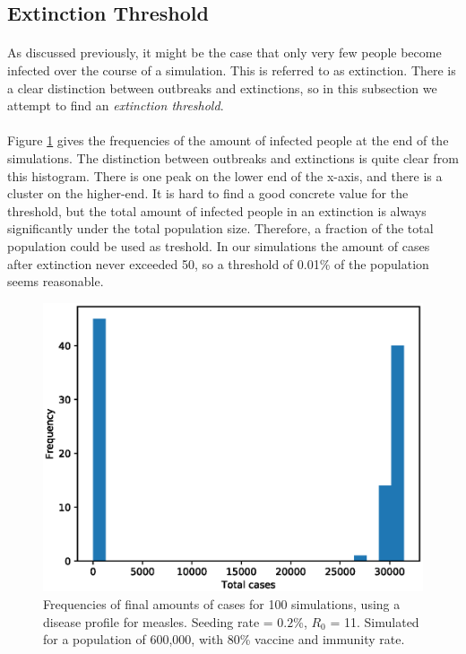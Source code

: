 \documentclass[runningheads]{llncs}
\begin{document}
\subsection{Extinction Threshold}

\paragraph{} As discussed previously, it might be the case that only very few people become infected over the course of a simulation. This is referred to as extinction. There is a clear distinction between outbreaks and extinctions, so in this subsection we attempt to find an \emph{extinction threshold}.

\paragraph{} Figure \ref{ETHist} gives the frequencies of the amount of infected people at the end of the simulations. The distinction between outbreaks and extinctions is quite clear from this histogram. There is one peak on the lower end of the x-axis, and there is a cluster on the higher-end. It is hard to find a good concrete value for the threshold, but the total amount of infected people in an extinction is always significantly under the total population size. Therefore, a fraction of the total population could be used as treshold. In our simulations the amount of cases after extinction never exceeded 50, so a threshold of 0.01\% of the population seems reasonable.

\begin{figure}[!h]
	\includegraphics[width=\textwidth]{Hist.eps}
	\caption{Frequencies of final amounts of cases for 100 simulations, using a disease profile for measles. Seeding rate = $0.2$\%, $R_0$ = 11. Simulated for a population of 600,000, with 80\% vaccine and immunity rate.} 
	\label{ETHist}
\end{figure}
\end{document}
